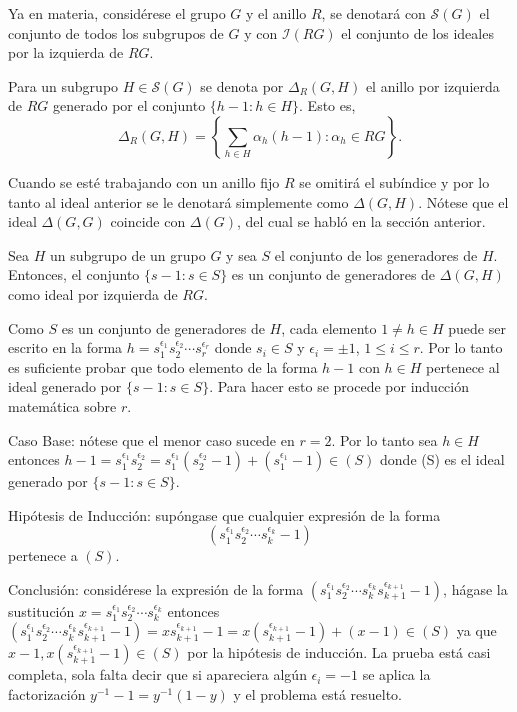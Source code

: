Ya en materia, considérese el grupo $G$ y el anillo $R$, se denotará con $\mathcal{S}(G)$  el conjunto de todos los subgrupos de $G$ y con $\mathcal{I}(RG)$ el conjunto de los ideales por la izquierda de $RG$.
\begin{definicion}
Para un subgrupo $H \in \mathcal{S}(G)$ se denota por $\Delta_{R}(G,H)$ el anillo por izquierda de $RG$ generado por el conjunto $\{h-1: h \in H \}$. Esto es, 
\begin{equation}
\Delta_{R}(G,H) = \left\{ \sum_{h \in H} \alpha_h(h-1) : \alpha_h \in RG \right\}.
\end{equation}
\end{definicion}

Cuando se esté trabajando con un anillo fijo $R$ se omitirá el subíndice y por lo tanto al ideal anterior se le denotará simplemente como $\Delta(G,H)$. Nótese que el ideal $\Delta(G,G)$ coincide con $\Delta(G)$, del cual se habló en la sección anterior.
\begin{lema}
Sea $H$ un subgrupo de un grupo $G$ y sea $S$ el conjunto de los generadores de $H$. Entonces, el conjunto $\{ s-1 : s \in S \}$ es un conjunto de generadores de $\Delta (G,H) $ como ideal por izquierda de $RG$.
\end{lema}
\begin{proof*}
Como $S$ es un conjunto de generadores de $H$, cada elemento $1 \neq h \in H$ puede ser escrito en la forma $h=s_1^{\epsilon_1} s_2^{\epsilon_2} \cdots s_r^{\epsilon_r} $ donde $s_i \in S$ y $\epsilon_i =\pm 1$, $1 \leq i \leq r$. Por lo tanto es suficiente probar que todo elemento de la forma $h-1$ con $h \in H$  pertenece al ideal generado por $\{s-1 : s \in S \}$. Para hacer esto se procede por inducción matemática sobre $r$. 

Caso Base: nótese que el menor caso sucede en $r =2$. Por lo tanto sea $h \in H$ entonces $h-1 = s_1^{\epsilon_1} s_2^{\epsilon_2} = s_1^{\epsilon_1}( s_2^{\epsilon_2} -1 ) + ( s_1^{\epsilon_1} -1 ) \in (S)  $ donde (S) es el ideal generado por $\{ s-1 : s \in S \}$.

Hipótesis de Inducción: supóngase que cualquier expresión de la forma \[(s_1^{\epsilon_1} s_2^{\epsilon_2} \cdots s_k^{\epsilon_k} -1)\]
pertenece a $(S)$.


Conclusión: considérese la expresión de la forma $ (s_1^{\epsilon_1} s_2^{\epsilon_2} \cdots s_k^{\epsilon_k}s_{k+1}^{\epsilon_{k+1}} -1) $, hágase la sustitución $x =  s_1^{\epsilon_1} s_2^{\epsilon_2} \cdots s_k^{\epsilon_k} $ entonces $ (s_1^{\epsilon_1} s_2^{\epsilon_2} \cdots s_k^{\epsilon_k}s_{k+1}^{\epsilon_{k+1}} -1)  = x s_{k+1}^{\epsilon_{k+1}} -1 = x( s_{k+1}^{\epsilon_{k+1}} -1 ) + (x-1) \in (S) $ ya que $x-1, x( s_{k+1}^{\epsilon_{k+1}} -1 ) \in (S)$ por la hipótesis de inducción. La prueba está casi completa, sola falta decir que si apareciera algún $\epsilon_i = -1$ se aplica la factorización $y^{-1}-1 = y^{-1}(1-y)$ y el problema está resuelto.
\end{proof*}

